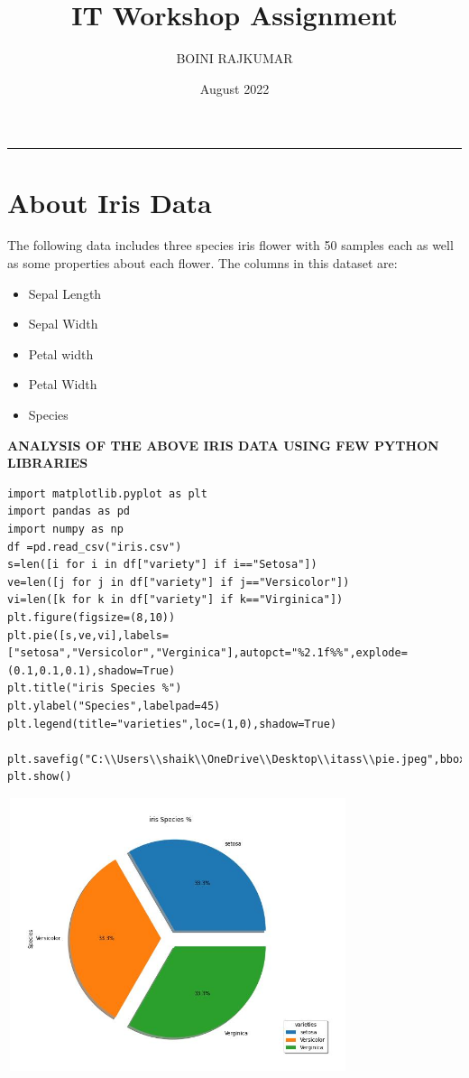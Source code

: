 \documentclass[12pt,a4paper]{article}
\title{IT Workshop Assignment }
\author{BOINI RAJKUMAR}
\affil{B192155}
\affil{CSE-C1}
\date{August 2022}
\begin{document}
\maketitle\vskip-15pt\hrule\vskip15pt


\section{About Iris Data}
The following data includes three species iris flower with 50 samples each as well as
some properties about each flower.
The columns in this dataset are:
\begin{itemize}
\color{brown}
\item Sepal Length
\color{red}
\item Sepal Width
\color{cyan}
\item Petal width
\color{lime}
\item Petal Width
\color{teal}
\item Species
\end{itemize}

\textbf{ANALYSIS OF THE ABOVE IRIS DATA USING FEW PYTHON LIBRARIES}



\begin{verbatim}
import matplotlib.pyplot as plt
import pandas as pd
import numpy as np
df =pd.read_csv("iris.csv")
s=len([i for i in df["variety"] if i=="Setosa"])
ve=len([j for j in df["variety"] if j=="Versicolor"])
vi=len([k for k in df["variety"] if k=="Virginica"])
plt.figure(figsize=(8,10))
plt.pie([s,ve,vi],labels=["setosa","Versicolor","Verginica"],autopct="%2.1f%%",explode=(0.1,0.1,0.1),shadow=True)
plt.title("iris Species %")
plt.ylabel("Species",labelpad=45)
plt.legend(title="varieties",loc=(1,0),shadow=True)

plt.savefig("C:\\Users\\shaik\\OneDrive\\Desktop\\itass\\pie.jpeg",bbox_inches="tight",pad_inches=0.5)
plt.show()
\end{verbatim}

\includegraphics[width=10cm, height=8cm]{pie.jpeg}
\end{document}
